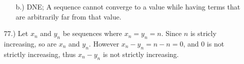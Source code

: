 \documentclass[12pt]{article}
\newcommand{\vertb}[1]{\left\vert#1\right\vert}
\begin{document}
\begin{itemize}
\begin{itemize}
        \item [b.)] DNE; A sequence cannot converge to a value while having terms that are arbitrarily far from that value.
    \end{itemize}


















    \item [77.)] Let $x_n$ and $y_n$ be sequences where $x_n=y_n=n$. Since $n$ is stricly increasing, so are $x_n$ and $y_n$. However $x_n-y_n=n-n=0$, and $0$ is not strictly increasing, thus $x_n-y_n$ is not strictly increasing.


\end{itemize}
\end{document}
